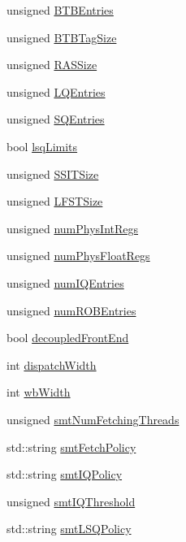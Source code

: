 \begin{DoxyCompactItemize}
\item 
unsigned \hyperlink{classSimpleParams_a891cffc1efd48bdaf7e9f1cc86024881}{BTBEntries}
\item 
unsigned \hyperlink{classSimpleParams_a0efeb0d5d0e725412d93550e7d944158}{BTBTagSize}
\item 
unsigned \hyperlink{classSimpleParams_a61543a0fbb2ca20aed4320f3d0192752}{RASSize}
\item 
unsigned \hyperlink{classSimpleParams_aafa99d800d574095881acbacdbbbcc47}{LQEntries}
\item 
unsigned \hyperlink{classSimpleParams_a38c8af5392da70119dc5cce4e3637cbc}{SQEntries}
\item 
bool \hyperlink{classSimpleParams_a448f97a01f3a53c40ed453a5e27c02ab}{lsqLimits}
\item 
unsigned \hyperlink{classSimpleParams_aa7b18ffebeef8540109bf838e4550405}{SSITSize}
\item 
unsigned \hyperlink{classSimpleParams_aebbe0d9f6d3d98802933c081796a2c0b}{LFSTSize}
\item 
unsigned \hyperlink{classSimpleParams_a2d5831d4c04167b2c0bcfab0b52aecc3}{numPhysIntRegs}
\item 
unsigned \hyperlink{classSimpleParams_ab78aae343ada7197200fff6af70ffed9}{numPhysFloatRegs}
\item 
unsigned \hyperlink{classSimpleParams_aed6944690de669371e8b8597cbd456ca}{numIQEntries}
\item 
unsigned \hyperlink{classSimpleParams_a22ae6772fdbf75cee936c5c0d9e7456e}{numROBEntries}
\item 
bool \hyperlink{classSimpleParams_a58989cf25fa8791be696b307e8ee430d}{decoupledFrontEnd}
\item 
int \hyperlink{classSimpleParams_aa304d4c426ea2bba52be0a3c0b9811e3}{dispatchWidth}
\item 
int \hyperlink{classSimpleParams_a20d3086e6bcdc826d99143ac7c9b23a4}{wbWidth}
\item 
unsigned \hyperlink{classSimpleParams_ac8b9ad691b32cad2c556506114224bb0}{smtNumFetchingThreads}
\item 
std::string \hyperlink{classSimpleParams_a3c7ed5f798c3bf7dc8a7307a24b0657f}{smtFetchPolicy}
\item 
std::string \hyperlink{classSimpleParams_a22db627938d793778d78b7245bbe44d8}{smtIQPolicy}
\item 
unsigned \hyperlink{classSimpleParams_a9f7e2a1b13adb819d2acccfdff0cc33b}{smtIQThreshold}
\item 
std::string \hyperlink{classSimpleParams_a861a2e77f731b7b07fc5288e008102a4}{smtLSQPolicy}

\end{DoxyCompactItemize}
